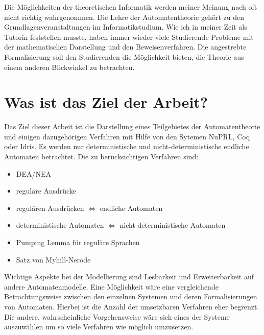 Die M\"oglichkeiten der theoretischen Informatik werden meiner Meinung nach oft nicht richtig wahrgenommen. Die Lehre der Automatentheorie geh\"ort zu den Grundlagenveranstaltungen im Informatikstudium. Wie ich in meiner Zeit als Tutorin feststellen musste, haben immer wieder viele Studierende Probleme mit der mathematischen Darstellung und den Beweisenverfahren. Die angestrebte Formalisierung soll den Studierenden die M\"oglichkeit bieten, die Theorie aus einem anderen Blickwinkel zu betrachten.

\section{Was ist das Ziel der Arbeit?}

Das Ziel dieser Arbeit ist die Darstellung eines Teilgebietes der Automatentheorie und einigen dazugeh\"origen Verfahren mit Hilfe von den Sytemen NuPRL, Coq oder Idris. Es werden nur deterministische und nicht-deterministische endliche Automaten betrachtet. Die zu ber\"ucksichtigen Verfahren sind:

\begin{itemize}
 \item DEA/NEA
 \item regul\"are Ausdr\"ucke
 \item regul\"aren Ausdr\"ucken $\Leftrightarrow$ endliche Automaten
 \item deterministische Automaten $\Leftrightarrow$ nicht-deterministische Automaten
 \item Pumping Lemma f\"ur regul\"are Sprachen
 \item Satz von Myhill-Nerode
\end{itemize}

Wichtige Aspekte bei der Modellierung sind Lesbarkeit und Erweiterbarkeit auf andere Automatenmodelle. Eine M\"oglichkeit w\"are eine vergleichende Betrachtungsweise zwischen den einzelnen Systemen und deren Formalisierungen von Automaten. Hierbei ist die Anzahl der umsetzbaren Verfahren eher begrenzt. Die andere, wahrscheinliche Vorgehensweise w\"are sich eines der Systeme auszuw\"ahlen um so viele Verfahren wie m\"oglich umzusetzen.

